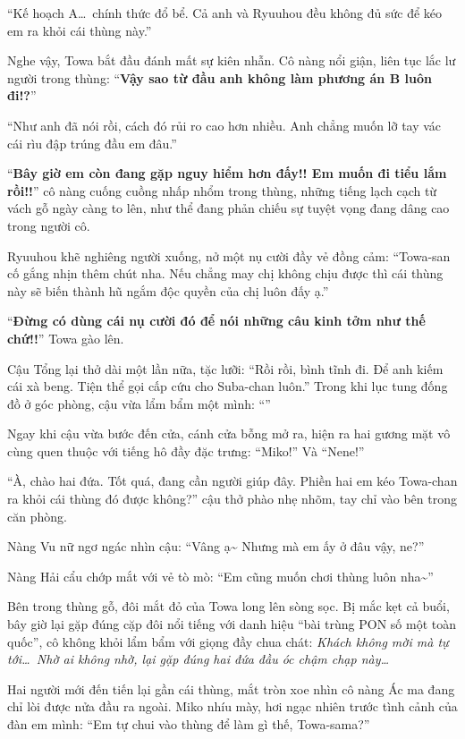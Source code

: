 \documentclass[../main.tex]{subfiles}
\begin{document}
``Kế hoạch A\dots\ chính thức đổ bể. Cả anh và Ryuuhou đều không đủ sức để kéo em ra khỏi cái thùng này.''

Nghe vậy, Towa bắt đầu đánh mất sự kiên nhẫn. Cô nàng nổi giận, liên tục lắc lư người trong thùng: ``\textbf{Vậy sao từ đầu anh không làm phương án B luôn đi!?}''

``Như anh đã nói rồi, cách đó rủi ro cao hơn nhiều. Anh chẳng muốn lỡ tay vác cái rìu đập trúng đầu em đâu.''

``\textbf{Bây giờ em còn đang gặp nguy hiểm hơn đấy!! Em muốn đi tiểu lắm rồi!!}'' cô nàng cuống cuồng nhấp nhổm trong thùng, những tiếng lạch cạch từ vách gỗ ngày càng to lên, như thể đang phản chiếu sự tuyệt vọng đang dâng cao trong người cô.

Ryuuhou khẽ nghiêng người xuống, nở một nụ cười đầy vẻ đồng cảm: ``Towa-san cố gắng nhịn thêm chút nha. Nếu chẳng may chị không chịu được thì cái thùng này sẽ biến thành hũ ngắm độc quyền của chị luôn đấy ạ.''

``\textbf{Đừng có dùng cái nụ cười đó để nói những câu kinh tởm như thế chứ!!}'' Towa gào lên.

Cậu Tổng lại thở dài một lần nữa, tặc lưỡi: ``Rồi rồi, bình tĩnh đi. Để anh kiếm cái xà beng. Tiện thể gọi cấp cứu cho Suba-chan luôn.'' Trong khi lục tung đống đồ ở góc phòng, cậu vừa lẩm bẩm một mình: ``''

Ngay khi cậu vừa bước đến cửa, cánh cửa bỗng mở ra, hiện ra hai gương mặt vô cùng quen thuộc với tiếng hô đầy đặc trưng: ``Miko!'' Và ``Nene!''


``À, chào hai đứa. Tốt quá, đang cần người giúp đây. Phiền hai em kéo Towa-chan ra khỏi cái thùng đó được không?'' cậu thở phào nhẹ nhõm, tay chỉ vào bên trong căn phòng.

Nàng Vu nữ ngơ ngác nhìn cậu: ``Vâng ạ\~{} Nhưng mà em ấy ở đâu vậy, ne?''

Nàng Hải cẩu chớp mắt với vẻ tò mò: ``Em cũng muốn chơi thùng luôn nha\~{}''

Bên trong thùng gỗ, đôi mắt đỏ của Towa long lên sòng sọc. Bị mắc kẹt cả buổi, bây giờ lại gặp đúng cặp đôi nổi tiếng với danh hiệu ``bài trùng PON số một toàn quốc'', cô không khỏi lẩm bẩm với giọng đầy chua chát: \textit{Khách không mời mà tự tới\dots\ Nhờ ai không nhờ, lại gặp đúng hai đứa đầu óc chậm chạp này\dots}

Hai người mới đến tiến lại gần cái thùng, mắt tròn xoe nhìn cô nàng Ác ma đang chỉ lòi được nửa đầu ra ngoài. Miko nhíu mày, hơi ngạc nhiên trước tình cảnh của đàn em mình: ``Em tự chui vào thùng để làm gì thế, Towa-sama?''
\end{document}
